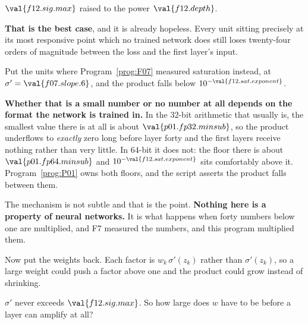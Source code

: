 \begin{fr}
$\val{f12.sig.max}$ raised to the power $\val{f12.depth}$.

\begin{trapbox}
\textbf{That is the best case}, and it is already hopeless. Every unit sitting
precisely at its most responsive point \dash{} which no trained network does
\dash{} still loses twenty-four orders of magnitude between the loss and the
first layer's input.

Put the units where Program~\ref{prog:F07} measured saturation instead, at
$\sigma' = \val{f07.slope.6}$, and the product falls below
$10^{-\val{f12.sat.exponent}}$.

\textbf{Whether that is a small number or no number at all depends on the
format the network is trained in.} In the $32$-bit arithmetic that usually
is, the smallest value there is at all is about
$\val{p01.fp32.minsub}$, so the product underflows to \emph{exactly} zero long
before layer forty and the first layers receive nothing rather than very
little. In $64$-bit it does not: the floor there is about
$\val{p01.fp64.minsub}$ and $10^{-\val{f12.sat.exponent}}$ sits comfortably
above it. Program~\ref{prog:P01} owns both floors, and the script asserts the
product falls between them.

The mechanism is not subtle and that is the point. \textbf{Nothing here is a
property of neural networks.} It is what happens when forty numbers below one
are multiplied, and F7 measured the numbers, and this program multiplied
them.
\end{trapbox}

\end{fr}

\begin{fr}
Now put the weights back. Each factor is $w_k\,\sigma'(z_k)$ rather than
$\sigma'(z_k)$, so a large weight could push a factor above one and the
product could grow instead of shrinking.

$\sigma'$ never exceeds $\val{f12.sig.max}$. So how large does $w$ have to be
before a layer can amplify at all?
\dotline
\nextframe
\end{fr}

